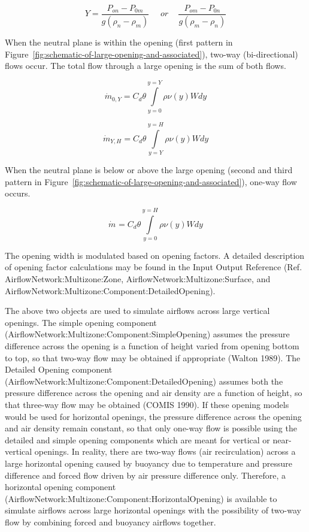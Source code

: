 \begin{equation}
Y = \frac{{{P_{on}} - {P_{0m}}}}{{g({\rho_n} - {\rho_m})}}\,\,\,\,\,\,\,\,or\,\,\,\,\,\,\,\frac{{{P_{om}} - {P_{0n}}}}{{g({\rho_m} - {\rho_n})}}
\end{equation}

When the neutral plane is within the opening (first pattern in Figure~\ref{fig:schematic-of-large-opening-and-associated}), two-way (bi-directional) flows occur. The total flow through a large opening is the sum of both flows.

\begin{equation}
{\dot m_{0,Y}} = {C_d}\theta \int\limits_{y = 0}^{y = Y} {\rho \nu (y)Wdy}
\end{equation}

\begin{equation}
{\dot m_{Y,H}} = {C_d}\theta \int\limits_{y = Y}^{y = H} {\rho \nu (y)Wdy}
\end{equation}

When the neutral plane is below or above the large opening (second and third pattern in Figure~\ref{fig:schematic-of-large-opening-and-associated}), one-way flow occurs.

\begin{equation}
{\dot m_{}} = {C_d}\theta \int\limits_{y = 0}^{y = H} {\rho \nu (y)Wdy}
\end{equation}

The opening width is modulated based on opening factors. A detailed description of opening factor calculations may be found in the Input Output Reference (Ref. AirflowNetwork:Multizone:Zone, AirflowNetwork:Multizone:Surface, and AirflowNetwork:Multizone:Component:DetailedOpening).

The above two objects are used to simulate airflows across large vertical openings. The simple opening component (AirflowNetwork:Multizone:Component:SimpleOpening) assumes the pressure difference across the opening is a function of height varied from opening bottom to top, so that two-way flow may be obtained if appropriate (Walton 1989). The Detailed Opening component (AirflowNetwork:Multizone:Component:DetailedOpening) assumes both the pressure difference across the opening and air density are a function of height, so that three-way flow may be obtained (COMIS 1990). If these opening models would be used for horizontal openings, the pressure difference across the opening and air density remain constant, so that only one-way flow is possible using the detailed and simple opening components which are meant for vertical or near-vertical openings. In reality, there are two-way flows (air recirculation) across a large horizontal opening caused by buoyancy due to temperature and pressure difference and forced flow driven by air pressure difference only. Therefore, a horizontal opening component (AirflowNetwork:Multizone:Component:HorizontalOpening) is available to simulate airflows across large horizontal openings with the possibility of two-way flow by combining forced and buoyancy airflows together.

